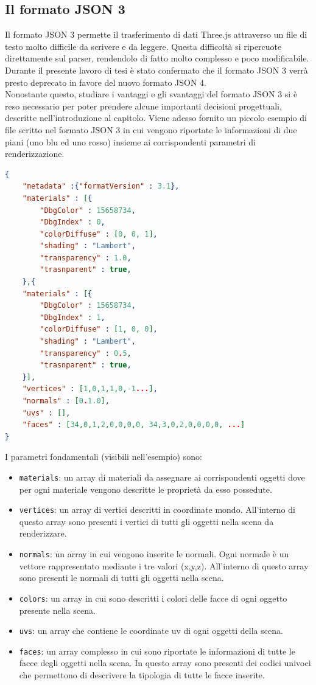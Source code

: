 \subsection{Il formato JSON 3}
Il formato JSON 3 permette il trasferimento di dati Three.js attraverso un file di testo molto difficile da scrivere e da leggere. 
Questa difficoltà si ripercuote direttamente sul parser, rendendolo di fatto molto complesso e poco modificabile.
Durante il presente lavoro di tesi è stato confermato che il formato JSON 3 verrà presto deprecato in favore del nuovo formato JSON 4.
\\
Nonostante questo, studiare i vantaggi e gli svantaggi del formato JSON 3 si è reso necessario per poter prendere alcune importanti decisioni progettuali, descritte nell'introduzione al capitolo.
Viene adesso fornito un piccolo esempio di file scritto nel formato JSON 3 in cui vengono riportate le informazioni di due piani (uno blu ed uno rosso) insieme ai corrispondenti parametri di renderizzazione.

\begin{lstlisting}[language=json]
{ 
	"metadata" :{"formatVersion" : 3.1},
	"materials" : [{
		"DbgColor" : 15658734,
		"DbgIndex" : 0,
		"colorDiffuse" : [0, 0, 1],
		"shading" : "Lambert",
		"transparency" : 1.0,
		"trasnparent" : true,
	},{
	"materials" : [{
		"DbgColor" : 15658734,
		"DbgIndex" : 1,
		"colorDiffuse" : [1, 0, 0],
		"shading" : "Lambert",
		"transparency" : 0.5,
		"trasnparent" : true,
	}],
	"vertices" : [1,0,1,1,0,-1...],
	"normals" : [0.1.0],
	"uvs" : [],
	"faces" : [34,0,1,2,0,0,0,0, 34,3,0,2,0,0,0,0, ...]
}
\end{lstlisting}
I parametri fondamentali (visibili nell’esempio) sono:
\begin{itemize}
\item \texttt{materials}: un array di materiali da assegnare ai corrispondenti oggetti dove per ogni materiale vengono descritte le proprietà da esso possedute.
\item \texttt{vertices}: un array di vertici descritti in coordinate mondo. All’interno di questo array sono presenti i vertici di tutti gli oggetti nella scena da renderizzare.
\item \texttt{normals}: un array in cui vengono inserite le normali. Ogni normale è un vettore rappresentato mediante i tre valori (x,y,z). All’interno di questo array sono presenti le normali di tutti gli oggetti nella scena.
\item \texttt{colors}: un array in cui sono descritti i colori delle facce di ogni oggetto presente nella scena.
\item \texttt{uvs}: un array che contiene le coordinate uv di ogni oggetti della scena.
\item \texttt{faces}: un array complesso in cui sono riportate le informazioni di tutte le facce degli oggetti nella scena. In questo array sono presenti dei codici univoci che permettono di descrivere la tipologia di tutte le facce inserite.
\end{itemize}

